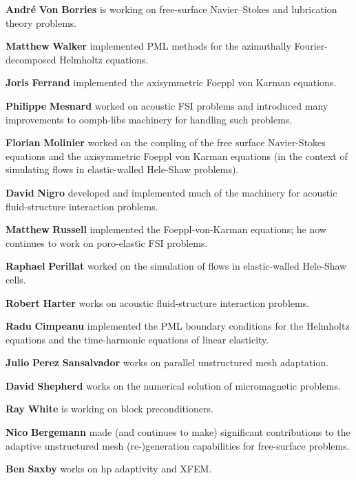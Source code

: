 \begin{DoxyItemize}
\item {\bfseries Andr\'{e}} {\bfseries Von} {\bfseries Borries} is working on free-\/surface Navier--Stokes and lubrication theory problems.
\item {\bfseries Matthew} {\bfseries Walker} implemented P\+ML methods for the azimuthally Fourier-\/decomposed Helmholtz equations.
\item {\bfseries Joris} {\bfseries Ferrand} implemented the axisymmetric Foeppl von Karman equations.
\item {\bfseries Philippe} {\bfseries Mesnard} worked on acoustic F\+SI problems and introduced many improvements to {\ttfamily oomph-\/lib\textquotesingle{}s} machinery for handling such problems.
\item {\bfseries Florian} {\bfseries Molinier} worked on the coupling of the free surface Navier-\/\+Stokes equations and the axisymmetric Foeppl von Karman equations (in the context of simulating flows in elastic-\/walled Hele-\/\+Shaw problems).
\item {\bfseries David} {\bfseries Nigro} developed and implemented much of the machinery for acoustic fluid-\/structure interaction problems.
\item {\bfseries Matthew} {\bfseries Russell} implemented the Foeppl-\/von-\/\+Karman equations; he now continues to work on poro-\/elastic F\+SI problems.
\item {\bfseries Raphael} {\bfseries Perillat} worked on the simulation of flows in elastic-\/walled Hele-\/\+Shaw cells.
\item {\bfseries Robert} {\bfseries Harter} works on acoustic fluid-\/structure interaction problems.
\item {\bfseries Radu} {\bfseries Cimpeanu} implemented the P\+ML boundary conditions for the Helmholtz equations and the time-\/harmonic equations of linear elasticity.
\item {\bfseries Julio} {\bfseries Perez} {\bfseries Sansalvador} works on parallel unstructured mesh adaptation.
\item {\bfseries David} {\bfseries Shepherd} works on the numerical solution of micromagnetic problems.
\item {\bfseries Ray} {\bfseries White} is working on block preconditioners.
\item {\bfseries Nico} {\bfseries Bergemann} made (and continues to make) significant contributions to the adaptive unstructured mesh (re-\/)generation capabilities for free-\/surface problems.
\item {\bfseries Ben} {\bfseries Saxby} works on hp adaptivity and X\+F\+EM.

\end{DoxyItemize}
